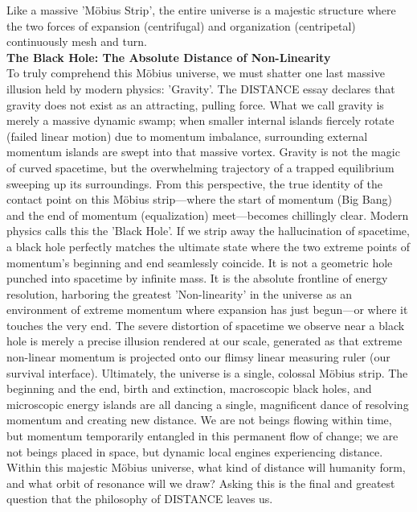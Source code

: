 Like a massive 'Möbius Strip', the entire universe is a majestic structure where the two forces of expansion (centrifugal) and organization (centripetal) continuously mesh and turn. \\
\textbf{The Black Hole: The Absolute Distance of Non-Linearity} \\
To truly comprehend this Möbius universe, we must shatter one last massive illusion held by modern physics: 'Gravity'. The DISTANCE essay declares that gravity does not exist as an attracting, pulling force. What we call gravity is merely a massive dynamic swamp; when smaller internal islands fiercely rotate (failed linear motion) due to momentum imbalance, surrounding external momentum islands are swept into that massive vortex. Gravity is not the magic of curved spacetime, but the overwhelming trajectory of a trapped equilibrium sweeping up its surroundings.
From this perspective, the true identity of the contact point on this Möbius strip—where the start of momentum (Big Bang) and the end of momentum (equalization) meet—becomes chillingly clear. Modern physics calls this the 'Black Hole'.
If we strip away the hallucination of spacetime, a black hole perfectly matches the ultimate state where the two extreme points of momentum's beginning and end seamlessly coincide. It is not a geometric hole punched into spacetime by infinite mass. It is the absolute frontline of energy resolution, harboring the greatest 'Non-linearity' in the universe as an environment of extreme momentum where expansion has just begun—or where it touches the very end. The severe distortion of spacetime we observe near a black hole is merely a precise illusion rendered at our scale, generated as that extreme non-linear momentum is projected onto our flimsy linear measuring ruler (our survival interface).
Ultimately, the universe is a single, colossal Möbius strip. The beginning and the end, birth and extinction, macroscopic black holes, and microscopic energy islands are all dancing a single, magnificent dance of resolving momentum and creating new distance. We are not beings flowing within time, but momentum temporarily entangled in this permanent flow of change; we are not beings placed in space, but dynamic local engines experiencing distance.
Within this majestic Möbius universe, what kind of distance will humanity form, and what orbit of resonance will we draw? Asking this is the final and greatest question that the philosophy of DISTANCE leaves us.